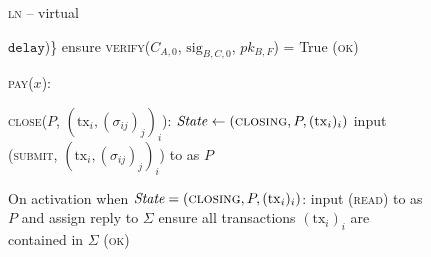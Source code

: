 \begin{figure}[H]
\begin{processbox}{\textsc{ln} -- virtual}
\begin{algorithmic}[1]
{          $\texttt{delay}$)\}}
          \State {}
          \State {}
          \State {}
          \State {}
          \State ensure \textsc{verify}($C_{A, 0}$, $\mathrm{sig}_{B, C, 0}$,
          $pk_{B, F}$) = True
        \EndIf
        \State \Return (\textsc{ok})
      \EndIndent
      \Statex

      \State \textsc{pay}($x$):
      \Indent
        \State \TODO{}
      \EndIndent
      \Statex

      \State \textsc{close}($P$, $(\mathrm{tx}_i, (\sigma_{ij})_j)_i$):
      \Indent
        \State {}
        \State $\mathit{State} \gets (\textsc{closing}, P, (\mathrm{tx}_i)_i)$
        \State input (\textsc{submit}, $(\mathrm{tx}_i, (\sigma_{ij})_j)_i$)
        to \ledger as $P$
      \EndIndent
      \Statex

      \State On activation when $\textit{State} = (\textsc{closing}, P,
      (\mathrm{tx}_i)_i)$:
      \Indent
        \State input (\textsc{read}) to \ledger as $P$ and assign reply to
        $\Sigma$
        \State ensure all transactions $(\mathrm{tx}_i)_i$ are contained in
        $\Sigma$
        \State \Return (\textsc{ok})
      \EndIndent
    \end{algorithmic}
  \end{processbox}
  \caption{}
  \label{code:ln:virtual}
\end{figure}
